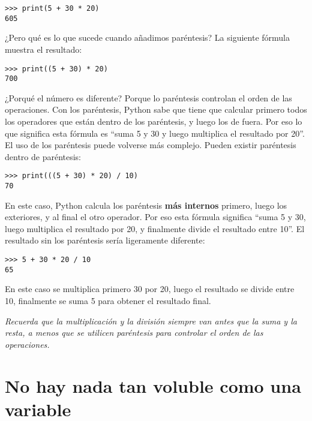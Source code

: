 \begin{listing}
\begin{verbatim}
>>> print(5 + 30 * 20)
605
\end{verbatim}
\end{listing}

\noindent
¿Pero qué es lo que sucede cuando añadimos paréntesis? La siguiente fórmula muestra el resultado:

\begin{listing}
\begin{verbatim}
>>> print((5 + 30) * 20)
700
\end{verbatim}
\end{listing}

\noindent
¿Porqué el número es diferente? Porque lo paréntesis controlan el orden de las operaciones. Con los paréntesis, Python sabe que tiene que calcular primero todos los operadores que están dentro de los paréntesis, y luego los de fuera. Por eso lo que significa esta fórmula es ``suma 5 y 30 y luego multiplica el resultado por 20''.
El uso de los paréntesis puede volverse más complejo. Pueden existir paréntesis dentro de paréntesis:

\begin{listing}
\begin{verbatim}
>>> print(((5 + 30) * 20) / 10)
70
\end{verbatim}
\end{listing}

\noindent
En este caso, Python calcula los paréntesis \textbf{más internos} primero, luego los exteriores, y al final el otro operador. Por eso esta fórmula significa ``suma 5 y 30, luego multiplica el resultado por 20, y finalmente divide el resultado entre 10''. El resultado sin los paréntesis sería ligeramente diferente:

\begin{listing}
\begin{verbatim}
>>> 5 + 30 * 20 / 10
65
\end{verbatim}
\end{listing}

En este caso se multiplica primero 30 por 20, luego el resultado se divide entre 10, finalmente se suma 5 para obtener el resultado final.

\emph{Recuerda que la multiplicación y la división siempre van antes que la suma y la resta, a menos que se utilicen paréntesis para controlar el orden de las operaciones.}

\section{No hay nada tan voluble como una variable}

